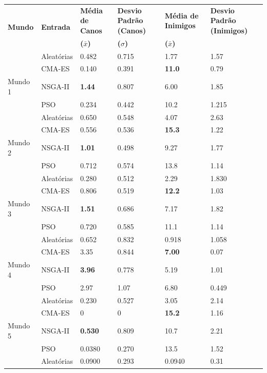 \begin{table}[h]
    \centering
    \begin{tabular}{|p{2cm}|p{3cm}|p{2cm}|p{2cm}|p{2cm}|p{2cm}|}
        \hline
        \multirow{2}{*}{\textbf{Mundo}} & \multirow{2}{*}{\textbf{Entrada}} & \textbf{Média de Canos} & \textbf{Desvio Padrão (Canos)} & \textbf{Média de Inimigos} & \textbf{Desvio Padrão (Inimigos)} \\
         & & \textbf{($\bar{x}$)} & \textbf{($\sigma$)} & \textbf{($\bar{x}$)} & \\
        \hline
         & Aleatórias & 0.482 & 0.715 & 1.77 & 1.57 \\
	 &  CMA-ES & 0.140 & 0.391 & \textbf{11.0} & 0.79 \\
	Mundo 1 &  NSGA-II & \textbf{1.44} & 0.807 & 6.00 & 1.85 \\
        & PSO & 0.234 & 0.442 & 10.2 & 1.215 \\
        \hline
        & Aleatórias & 0.650 & 0.548 & 4.07 & 2.63 \\
	& CMA-ES & 0.556 & 0.536 & \textbf{15.3} & 1.22 \\
	Mundo 2 & NSGA-II & \textbf{1.01} & 0.498 & 9.27 & 1.77 \\
         & PSO & 0.712 & 0.574 & 13.8 & 1.14 \\
        \hline
        & Aleatórias & 0.280 & 0.512 & 2.29 & 1.830 \\
	&  CMA-ES & 0.806 & 0.519 & \textbf{12.2} & 1.03 \\
	Mundo 3 & NSGA-II & \textbf{1.51} & 0.686 & 7.17 & 1.82 \\
        & PSO & 0.720 & 0.585 & 11.1 & 1.14 \\
        \hline
        &  Aleatórias & 0.652 & 0.832 & 0.918 & 1.058 \\
	&  CMA-ES & 3.35 & 0.844 & \textbf{7.00} & 0.07 \\
	Mundo 4 & NSGA-II & \textbf{3.96} & 0.778 & 5.19 & 1.01\\
        & PSO & 2.97 & 1.07 & 6.80 & 0.449 \\
        \hline
        & Aleatórias & 0.230 & 0.527 & 3.05 & 2.14 \\
	& CMA-ES & 0 & 0 & \textbf{15.2} & 1.16 \\
	Mundo 5 & NSGA-II & \textbf{0.530} & 0.809 & 10.7 & 2.21 \\
        & PSO & 0.0380 & 0.270 & 13.5 & 1.52 \\
        \hline
        & Aleatórias & 0.0900 & 0.293 & 0.0940 & 0.31 \\

\end{tabular}
\end{table}
